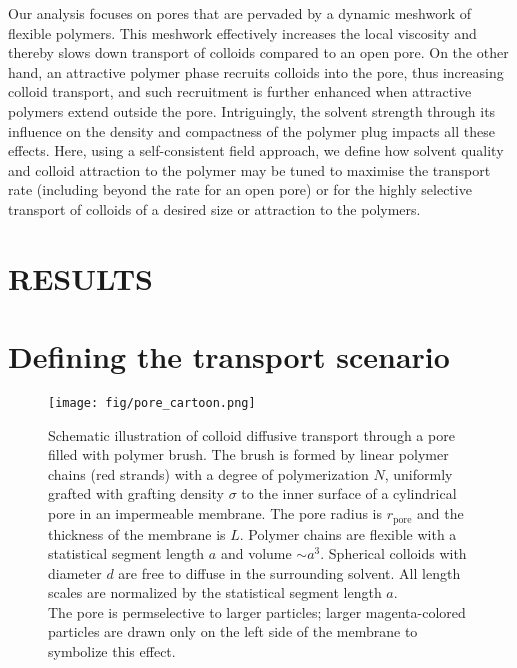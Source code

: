 \documentclass[12pt, a4paper]{article}
\begin{document}

Our analysis focuses on pores that are pervaded by a dynamic meshwork of flexible polymers. 
This meshwork effectively increases the local viscosity and thereby slows down transport of colloids compared to an open pore. 
On the other hand, an attractive polymer phase recruits colloids into the pore, thus increasing colloid transport, 
and such recruitment is further enhanced when attractive polymers extend outside the pore. 
Intriguingly, the solvent strength through its influence on the density and compactness of the polymer plug impacts all these effects. 
Here, using a self-consistent field approach, we define how solvent quality and colloid attraction to the polymer may be tuned 
to maximise the transport rate (including beyond the rate for an open pore) or for the highly selective transport of colloids of a desired size or attraction to the polymers.


\section{RESULTS}


\section{Defining the transport scenario}

\begin{figure}
    \centering
    \texttt{[image: fig/pore\_cartoon.png]}
    \caption{
        Schematic illustration of colloid diffusive transport through a pore filled with polymer brush. 
        The brush is formed by linear polymer chains (red strands) with a degree of polymerization $N$, uniformly grafted with grafting density $\sigma$ 
        to the inner surface of a cylindrical pore in an impermeable membrane. The pore radius is $r_{\text{pore}}$ and the thickness of the membrane is $L$.
        Polymer chains are flexible with a statistical segment length $a$ and volume $\sim a^3$. 
        Spherical colloids with diameter $d$ are free to diffuse in the surrounding solvent.
        All length scales are normalized by the statistical segment length $a$.
        \\
        The pore is permselective to larger particles; larger magenta-colored particles are drawn only on the left side of the membrane to symbolize this effect.
        }
    \label{fig:colloid_transport}
\end{figure}
\end{document}
